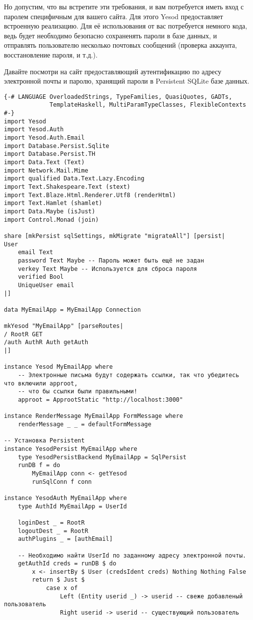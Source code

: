 Но допустим, что вы встретите эти требования, и вам потребуется иметь вход с паролем специфичным для вашего сайта. Для этого Yesod предоставляет встроенную реализацию. Для её использования от вас потребуется немного кода, ведь будет необходимо безопасно сохраненять пароли в базе данных, и отправлять пользователю несколько почтовых сообщений (проверка аккаунта, восстановление пароля, и т.д.).

Давайте посмотри на сайт предоставляющий аутентификацию по адресу электронной почты и паролю, хранящий пароли в Persistent SQLite базе данных.

\begin{lstlisting}
{-# LANGUAGE OverloadedStrings, TypeFamilies, QuasiQuotes, GADTs,
             TemplateHaskell, MultiParamTypeClasses, FlexibleContexts #-}
import Yesod
import Yesod.Auth
import Yesod.Auth.Email
import Database.Persist.Sqlite
import Database.Persist.TH
import Data.Text (Text)
import Network.Mail.Mime
import qualified Data.Text.Lazy.Encoding
import Text.Shakespeare.Text (stext)
import Text.Blaze.Html.Renderer.Utf8 (renderHtml)
import Text.Hamlet (shamlet)
import Data.Maybe (isJust)
import Control.Monad (join)

share [mkPersist sqlSettings, mkMigrate "migrateAll"] [persist|
User
    email Text
    password Text Maybe -- Пароль может быть ещё не задан
    verkey Text Maybe -- Используется для сброса пароля
    verified Bool
    UniqueUser email
|]

data MyEmailApp = MyEmailApp Connection

mkYesod "MyEmailApp" [parseRoutes|
/ RootR GET
/auth AuthR Auth getAuth
|]

instance Yesod MyEmailApp where
    -- Электронные письма будут содержать ссылки, так что убедитесь что включили approot, 
    -- что бы ссылки были правильными!
    approot = ApprootStatic "http://localhost:3000"

instance RenderMessage MyEmailApp FormMessage where
    renderMessage _ _ = defaultFormMessage

-- Установка Persistent
instance YesodPersist MyEmailApp where
    type YesodPersistBackend MyEmailApp = SqlPersist
    runDB f = do
        MyEmailApp conn <- getYesod
        runSqlConn f conn

instance YesodAuth MyEmailApp where
    type AuthId MyEmailApp = UserId

    loginDest _ = RootR
    logoutDest _ = RootR
    authPlugins _ = [authEmail]

    -- Необходимо найти UserId по заданному адресу электронной почты.
    getAuthId creds = runDB $ do
        x <- insertBy $ User (credsIdent creds) Nothing Nothing False
        return $ Just $
            case x of
                Left (Entity userid _) -> userid -- свеже добавленый пользователь
                Right userid -> userid -- существующий пользователь


\end{lstlisting}
